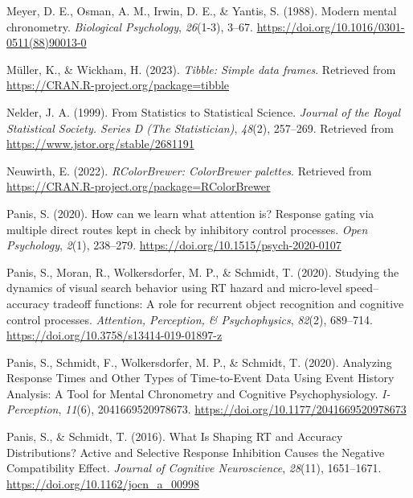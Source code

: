 \documentclass[
  man, donotrepeattitle,floatsintext]{apa6}
\newlength{\cslhangindent}
\newenvironment{CSLReferences}[2] %
 {\begin{list}{}{%
  \setlength{\itemindent}{0pt}
  \setlength{\leftmargin}{0pt}
  \setlength{\parsep}{0pt}
  \ifodd #1
   \setlength{\leftmargin}{\cslhangindent}
   \setlength{\itemindent}{-1\cslhangindent}
  \fi
  \setlength{\itemsep}{#2\baselineskip}}}
 {\end{list}}
\begin{document}
\begin{CSLReferences}{1}{0}
Meyer, D. E., Osman, A. M., Irwin, D. E., \& Yantis, S. (1988). Modern mental chronometry. \emph{Biological Psychology}, \emph{26}(1-3), 3--67. \url{https://doi.org/10.1016/0301-0511(88)90013-0}

Müller, K., \& Wickham, H. (2023). \emph{Tibble: Simple data frames}. Retrieved from \url{https://CRAN.R-project.org/package=tibble}

Nelder, J. A. (1999). From {Statistics} to {Statistical Science}. \emph{Journal of the Royal Statistical Society. Series D (The Statistician)}, \emph{48}(2), 257--269. Retrieved from \url{https://www.jstor.org/stable/2681191}

Neuwirth, E. (2022). \emph{RColorBrewer: ColorBrewer palettes}. Retrieved from \url{https://CRAN.R-project.org/package=RColorBrewer}

Panis, S. (2020). How can we learn what attention is? {Response} gating via multiple direct routes kept in check by inhibitory control processes. \emph{Open Psychology}, \emph{2}(1), 238--279. \url{https://doi.org/10.1515/psych-2020-0107}

Panis, S., Moran, R., Wolkersdorfer, M. P., \& Schmidt, T. (2020). Studying the dynamics of visual search behavior using {RT} hazard and micro-level speed--accuracy tradeoff functions: {A} role for recurrent object recognition and cognitive control processes. \emph{Attention, Perception, \& Psychophysics}, \emph{82}(2), 689--714. \url{https://doi.org/10.3758/s13414-019-01897-z}

Panis, S., Schmidt, F., Wolkersdorfer, M. P., \& Schmidt, T. (2020). Analyzing {Response Times} and {Other Types} of {Time-to-Event Data Using Event History Analysis}: {A Tool} for {Mental Chronometry} and {Cognitive Psychophysiology}. \emph{I-Perception}, \emph{11}(6), 2041669520978673. \url{https://doi.org/10.1177/2041669520978673}

Panis, S., \& Schmidt, T. (2016). What {Is Shaping RT} and {Accuracy Distributions}? {Active} and {Selective Response Inhibition Causes} the {Negative Compatibility Effect}. \emph{Journal of Cognitive Neuroscience}, \emph{28}(11), 1651--1671. \url{https://doi.org/10.1162/jocn_a_00998}


\end{CSLReferences}
\end{document}

